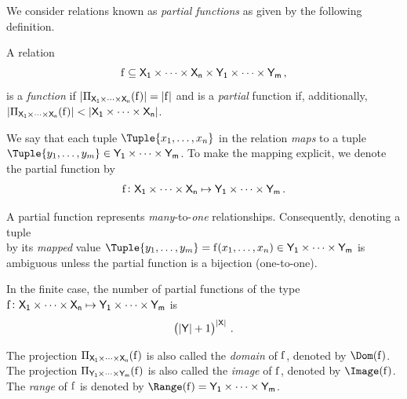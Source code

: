 \documentclass[11pt,final,hidelinks]{article}
\begin{document}
We consider relations known as \emph{partial functions} as given by the following definition.
\begin{definition}
	A relation
	\begin{equation}
	\PFun{f} \subseteq \Set{X}[1] \times \cdots \times \Set{X}[n] \times \Set{Y}[1] \times \cdots \times \Set{Y}[m]\,,
	\end{equation}
	is a \emph{function} if $\Card{\Proj_{\Set{X}[1] \times \cdots \times \Set{X}[n]}(\PFun{f})} = \Card{\PFun{f}}$ and is a \emph{partial} function if, additionally, $\Card{\Proj_{\Set{X}[1] \times \cdots \times \Set{X}[n]}(\PFun{f})} < \Card{\Set{X}[1] \times \cdots \times \Set{X}[n]}$.
	
	We say that each tuple $\Tuple{x_1,\ldots,x_n}$ in the relation \emph{maps} to a tuple $\Tuple{y_1,\ldots,y_m} \in \Set{Y}[1] \times \cdots \times \Set{Y}[m]$. To make the mapping explicit, we denote the partial function by
	\begin{equation}
	\PFun{f} \colon \Set{X}[1] \times \cdots \times \Set{X}[n] \mapsto \Set{Y}[1] \times \cdots \times \Set{Y}[m]\,.
	\end{equation}
\end{definition}
A partial function represents \emph{many}-to-\emph{one} relationships. Consequently, denoting a tuple
\begin{equation}
\end{equation}
by its \emph{mapped} value $\Tuple{y_1,\ldots,y_m} = \PFun{f}(x_1,\ldots,x_n) \in \Set{Y}[1] \times \cdots \times \Set{Y}[m]$ is ambiguous unless the partial function is a bijection (one-to-one).

In the finite case, the number of partial functions of the type $\PFun{f} \colon \Set{X}[1] \times \cdots \times \Set{X}[n] \mapsto \Set{Y}[1] \times \cdots \times \Set{Y}[m]$ is
\begin{equation}
\left(\Card{\Set{Y}} + 1\right)^{\Card{\Set{X}}}\,.
\end{equation}

The projection $\Proj_{\Set{X}[1] \times \cdots \times \Set{X}[n]}(\PFun{f})$ is also called the \emph{domain} of $\PFun{f}$, denoted by $\Dom(\PFun{f})$. The projection $\Proj_{\Set{Y}[1] \times \cdots \times \Set{Y}[m]}(\PFun{f})$ is also called the \emph{image} of $\PFun{f}$, denoted by $\Image(\PFun{f})$. The \emph{range} of $\PFun{f}$ is denoted by $\Range(\PFun{f}) = \Set{Y}[1] \times \cdots \times \Set{Y}[m]$.
\end{document}
